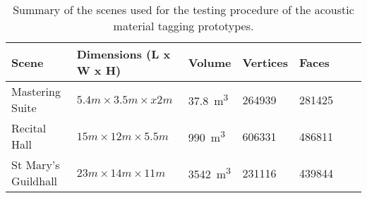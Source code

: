 \begin{table}[htbp]
\centering
\begin{tabular}{@{}lllllll@{}}
\toprule
Scene               & Dimensions (L x W x H)         & Volume                      & Vertices & Faces   \\ \midrule
Mastering Suite     & $5.4m \times 3.5m \times x 2m$ & \qty{37.8}{\metre\tothe{3}} & 264939   & 281425  \\
Recital Hall        & $15m \times12m \times 5.5m$    & \qty{990}{\metre\tothe{3}}  & 606331   & 486811  \\
St Mary's Guildhall & $23m \times14m \times 11m $    & \qty{3542}{\metre\tothe{3}} & 231116   & 439844  \\ \bottomrule
\end{tabular}
\caption{Summary of the scenes used for the testing procedure of the acoustic material tagging prototypes.}
\label{tab:material-eval-scenes}
\end{table}